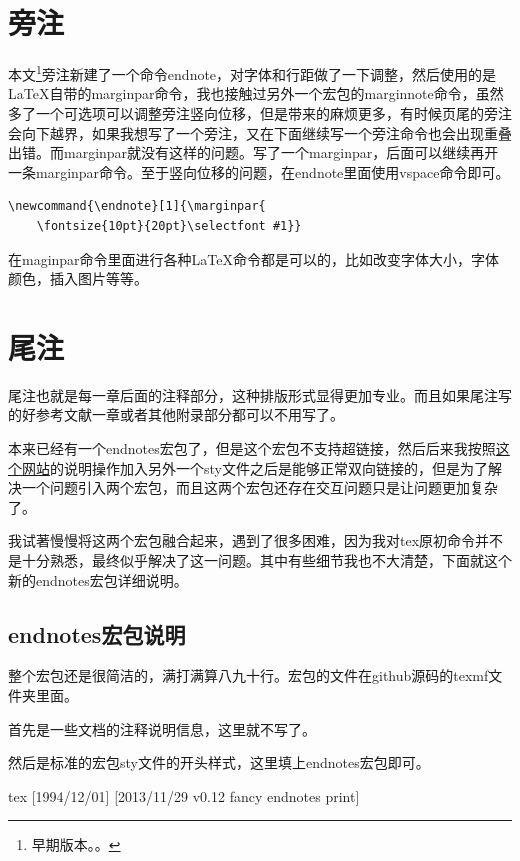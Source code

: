 \documentclass[11pt,oneside]{book}
\begin{document}
\begin{common-format}
\section{旁注}
本文\footnote{早期版本。。}旁注新建了一个命令endnote，对字体和行距做了一下调整，然后使用的是\LaTeX 自带的marginpar命令，我也接触过另外一个宏包的marginnote命令，虽然多了一个可选项可以调整旁注竖向位移，但是带来的麻烦更多，有时候页尾的旁注会向下越界，如果我想写了一个旁注，又在下面继续写一个旁注命令也会出现重叠出错。而marginpar就没有这样的问题。写了一个marginpar，后面可以继续再开一条marginpar命令。至于竖向位移的问题，在endnote里面使用vspace命令即可。
\begin{Verbatim}
\newcommand{\endnote}[1]{\marginpar{  
 	\fontsize{10pt}{20pt}\selectfont #1}}
\end{Verbatim}

在maginpar命令里面进行各种\LaTeX 命令都是可以的，比如改变字体大小，字体颜色，插入图片等等。

\section{尾注}
尾注也就是每一章后面的注释部分，这种排版形式显得更加专业。而且如果尾注写的好参考文献一章或者其他附录部分都可以不用写了。

本来已经有一个endnotes宏包了，但是这个宏包不支持超链接，然后后来我按照\href{http://tex.stackexchange.com/questions/8452/making-endnotes-clickable-links-with-hyperref}{这个网站}的说明操作加入另外一个sty文件之后是能够正常双向链接的，但是为了解决一个问题引入两个宏包，而且这两个宏包还存在交互问题只是让问题更加复杂了。

我试著慢慢将这两个宏包融合起来，遇到了很多困难，因为我对tex原初命令并不是十分熟悉，最终似乎解决了这一问题。其中有些细节我也不大清楚，下面就这个新的endnotes宏包详细说明。


\subsection{endnotes宏包说明}
整个宏包还是很简洁的，满打满算八九十行。宏包的文件在github源码的texmf文件夹里面。

首先是一些文档的注释说明信息，这里就不写了。

然后是标准的宏包sty文件的开头样式，这里填上endnotes宏包即可。
\begin{cverbatim}{tex}
[1994/12/01]
[2013/11/29 v0.12  fancy endnotes  print]
\end{cverbatim}


\end{common-format}
\end{document}
